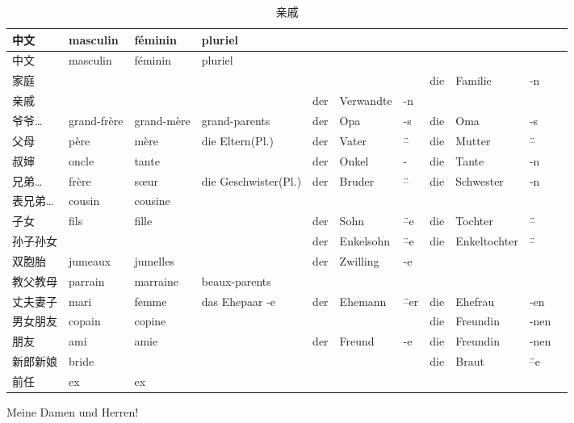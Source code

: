 \documentclass[12pt,A4paper,oneside,reqno]{amsart}
\numberwithin{equation}{section}
\theoremstyle{plain}
\theoremstyle{plain}
\theoremstyle{plain}
\numberwithin{equation}{section}
\theoremstyle{remark}
\begin{document}
{
	
	\setlength\LTleft{-0.5in}
	\setlength{}
\setlength{\tabcolsep}{4pt}
\begin{longtable}{l|l|l|l|rll|rlll}
	\hline
中文&	masculin	&	f\'{e}minin	& 	pluriel		&		&		&		&		&		&		&	\\
	\hline
	\endhead
	\hline
中文&	masculin	&	f\'{e}minin	& 	pluriel		&		&		&		&		&		&		&	\\
	\hline
	\endfirsthead	
	\hline
	\endfoot
	\hline		
	\caption{亲戚}
	\endlastfoot				
家庭	&		&		&		&		&		&		&	die	&	Familie	&	-n	&	\\
亲戚	&		&		&		&	der	&	Verwandte	&	-n	&		&		&		&	\\
\hline																				
爷爷…	&	grand-fr\`{e}re	&	grand-m\`{e}re	&	grand-parents	&	der	&	Opa	&	-s	&	die	&	Oma	&	-s	&	\\
父母	&	p\`{e}re	&	m\`{e}re	&	die Eltern(Pl.)	&	der	&	Vater	&	\"{--}	&	die	&	Mutter	&	\"{--}	&	\\
叔婶	&	oncle	&	tante	&		&	der	&	Onkel	&	-	&	die	&	Tante	&	-n	&	\\
兄弟…	&	fr\`{e}re	&	s\oe ur	&	die Geschwister(Pl.)	&	der	&	Bruder	&	\"{--}	&	die	&	Schwester	&	-n	&	\\
表兄弟…	&	cousin	&	cousine	&		&		&		&		&		&		&		&	\\
子女	&	fils	&	fille	&		&	der	&	Sohn	&	\"{--}e	&	die	&	Tochter	&	\"{--}	&	\\
孙子孙女	&		&		&		&	der	&	Enkelsohn	&	\"{--}e	&	die	&	Enkeltochter	&	\"{--}	&	\\
双胞胎	&	jumeaux	&	jumelles	&		&	der	&	Zwilling	&	-e	&		&		&		&	\\
\hline																				
教父教母	&	parrain	&	marraine	&	beaux-parents	&		&		&		&		&		&		&	\\
丈夫妻子	&	mari	&	femme	&	das Ehepaar -e	&	der	&	Ehemann	&	\"{--}er	&	die 	&	Ehefrau	&	-en	&	\\
男女朋友	&	copain	&	copine	&		&		&		&		&	die	&	Freundin	&	-nen	&	\\
朋友	&	ami	&	amie	&		&	der	&	Freund	&	-e	&	die	&	Freundin	&	-nen	&	\\
新郎新娘	&	bride	&		&		&		&		&		&	die	&	Braut	&	\"{--}e	&	\\
前任	&	ex	&	ex	&		&		&		&		&		&		&		&	\\

\end{longtable}
}
 Meine Damen und Herren!
\end{document}
